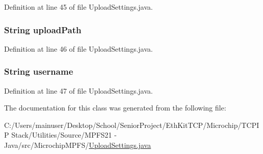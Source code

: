 Definition at line 45 of file Upload\+Settings.\+java.

\hypertarget{class_microchip_m_p_f_s_1_1_upload_settings_a2283c4ddae1a5d953c73c740f1e4baad}{}
\subsubsection[{upload\+Path}]{\setlength{\rightskip}{0pt plus 5cm}String upload\+Path}\label{class_microchip_m_p_f_s_1_1_upload_settings_a2283c4ddae1a5d953c73c740f1e4baad}


Definition at line 46 of file Upload\+Settings.\+java.

\hypertarget{class_microchip_m_p_f_s_1_1_upload_settings_ae91c86c4d1584286de9492f51957ac23}{}
\subsubsection[{username}]{\setlength{\rightskip}{0pt plus 5cm}String username}\label{class_microchip_m_p_f_s_1_1_upload_settings_ae91c86c4d1584286de9492f51957ac23}


Definition at line 47 of file Upload\+Settings.\+java.



The documentation for this class was generated from the following file\+:\begin{DoxyCompactItemize}
\item 
C\+:/\+Users/mainuser/\+Desktop/\+School/\+Senior\+Project/\+Eth\+Kit\+T\+C\+P/\+Microchip/\+T\+C\+P\+I\+P Stack/\+Utilities/\+Source/\+M\+P\+F\+S21 -\/ Java/src/\+Microchip\+M\+P\+F\+S/\hyperlink{_upload_settings_8java}{Upload\+Settings.\+java}\end{DoxyCompactItemize}
